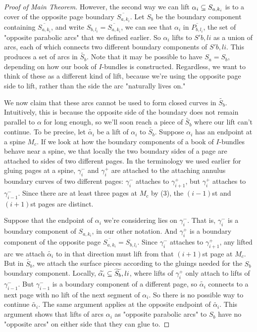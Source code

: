 \begin{proof}[Proof of Main Theorem]
However, the second way we can lift $\alpha_i \subseteq S_{a,k_i}$ is to a cover of the
opposite page boundary $\overline{S_{a,k_i}}$. Let $S_b$ be the boundary component
containing $\overline{S_{a,k_i}}$, and write $S_{b,l_i} = \overline{S_{a,k_i}}$, we can see that $\alpha_i$
in $\overline{P_{b,l_i}}$, the set of "opposite parabolic arcs" that we defined earlier.
So $\alpha_i$ lifts to $S'b,li$ as a union of arcs, each of which connects two
different boundary components of $S'b,li$. This produces a set of arcs in
$\widetilde{S_b}$. Note that it may be possible to have $S_a = S_b$, depending on
how our book of $I$-bundles is constructed.  Regardless, we want to think of
these as a different kind of lift, because we're using the opposite page side
to lift, rather than the side the arc "naturally lives on."

We now claim that these arcs cannot be used to form closed curves in
$\widetilde{S_b}$.  Intuitively, this is because the opposite side of the
boundary does not remain parallel to $\alpha$ for long enough, so we'll soon
reach a piece of $\widetilde{S_b}$ where our lift can't continue.  To be
precise, let $\widetilde{\alpha_i}$ be a lift of $\alpha_i$ to
$\widetilde{S_b}$.  Suppose $\alpha_i$ has an endpoint at a spine $M_c$. If we
look at how the boundary components of a book of $I$-bundles behave near
a spine, we that locally the two boundary sides of a page are attached to sides
of two different pages.  In the terminology we used earlier for gluing pages at
a spine, $\gamma_i^-$ and $\gamma_i^+$ are attached to the attaching annulus
boundary curves of two different pages: $\gamma_i^-$ attaches to
$\gamma_{i+1}^+$, but $\gamma_i^+$ attaches to $\gamma_{i-1}^-$.  Since there
are at least three pages at $M_c$ by (3), the $(i-1)$st and $(i+1)$st pages are
distinct.

Suppose that the endpoint of $\alpha_i$ we're considering lies on $\gamma_i^-$. That
is, $\gamma_i^-$ is a boundary component of $S_{a,k_i}$, in our other notation. And
$\gamma_i^+$ is a boundary component of the opposite page $\overline{S_{a,k_i}} = S_{b,l_i}$.
Since $\gamma_i^-$ attaches to $\gamma_{i+1}^+$, any lifted arc we attach
$\widetilde{\alpha_i}$ to in that direction must lift from that $(i+1)$st page at $M_c$.
But in $\widetilde{S_b}$, we attach the surface pieces according to the gluings needed
for the $S_b$ boundary component.  Locally, $\widetilde{\alpha_i} \subseteq \widetilde{S_b},li$, where
lifts of $\gamma_i^+$ only attach to lifts of $\gamma_{i-1}^-$. But $\gamma_{i-1}^-$ is
a boundary component of a different page, so $\widetilde{\alpha_i}$ connects to a next
page with no lift of the next segment of $\alpha_i$. So there is no possible way
to continue $\widetilde{\alpha_i}$.  The same argument applies at the opposite endpoint
of $\widetilde{\alpha_i}$. This argument shows that lifts of arcs $\alpha_i$ as "opposite
parabolic arcs" to $S_b$ have no "opposite arcs" on either side that they can
glue to.


\end{proof}
